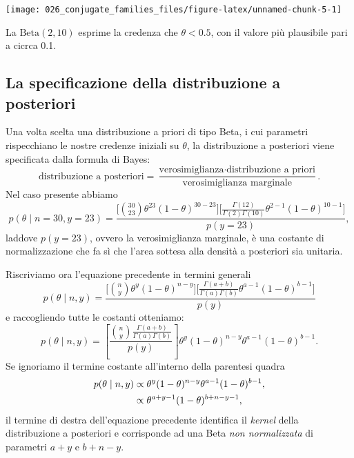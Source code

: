 \documentclass[
  10pt,
  italian,
  a4paper,
  extrafontsizes,onecolumn,openright
  ]{memoir}
\theoremstyle{definition}
\theoremstyle{definition}
\theoremstyle{definition}
\theoremstyle{definition}
\theoremstyle{remark}
\begin{document}
\begin{center}\texttt{[image: 026\_conjugate\_families\_files/figure-latex/unnamed-chunk-5-1]} \end{center}

\noindent
La \(\mbox{Beta}(2, 10)\) esprime la credenza che \(\theta < 0.5\), con il valore più plausibile pari a cicrca 0.1.

\hypertarget{la-specificazione-della-distribuzione-a-posteriori}{%
\subsection{La specificazione della distribuzione a posteriori}\label{la-specificazione-della-distribuzione-a-posteriori}}

Una volta scelta una distribuzione a priori di tipo Beta, i cui parametri rispecchiano le nostre credenze iniziali su \(\theta\), la distribuzione a posteriori viene specificata dalla formula di Bayes:
\[
\text{distribuzione a posteriori} = \frac{\text{verosimiglianza}\cdot\text{distribuzione a priori}}{\text{verosimiglianza marginale}}.
\]
Nel caso presente abbiamo
\[
p(\theta \mid n=30, y=23) = \frac{\Big[\binom{30}{23}\theta^{23}(1-\theta)^{30-23}\Big]\Big[\frac{\Gamma(12)}{\Gamma(2)\Gamma(10)}\theta^{2-1} (1-\theta)^{10-1}\Big]}{p(y = 23)},
\]
laddove \(p(y = 23)\), ovvero la verosimiglianza marginale, è una costante di normalizzazione che fa sì che l'area sottesa alla densità a posteriori sia unitaria.

Riscriviamo ora l'equazione precedente in termini generali
\[
p(\theta \mid n, y) = \frac{\Big[\binom{n}{y}\theta^{y}(1-\theta)^{n-y}\Big]\Big[\frac{\Gamma(a+b)}{\Gamma(a)\Gamma(b)}\theta^{a-1} (1-\theta)^{b-1}\Big]}{p(y)}
\]
\noindent
e raccogliendo tutte le costanti otteniamo:
\[
p(\theta \mid n, y) =\left[\frac{\binom{n}{y}\frac{\Gamma(a+b)}{\Gamma(a)\Gamma(b)}}{p(y)}\right] \theta^{y}(1-\theta)^{n-y}\theta^{a-1} (1-\theta)^{b-1}.
\]
\noindent
Se ignoriamo il termine costante all'interno della parentesi quadra
\begin{align}
p(\theta \mid n, y) &\propto \theta^{y}(1-\theta)^{n-y}\theta^{a-1} (1-\theta)^{b-1},\notag\\
&\propto \theta^{a+y-1}(1-\theta)^{b+n-y-1},\notag
\end{align}
\noindent
il termine di destra dell'equazione precedente identifica il \emph{kernel} della distribuzione a posteriori e corrisponde ad una Beta \emph{non normalizzata} di parametri \(a + y\) e \(b + n - y\).
\end{document}
